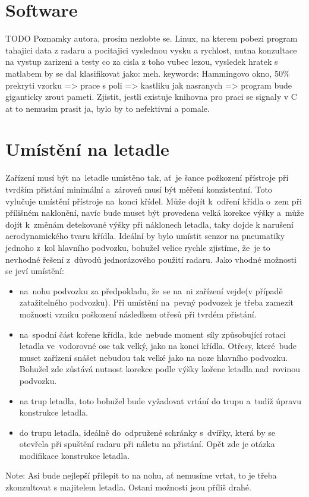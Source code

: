 	\section{Software}\label{navrhReseni::software}
		
		TODO Poznamky autora, prosim nezlobte se. Linux, na kterem pobezi program tahajici data z radaru a pocitajici vyslednou vysku a rychlost, nutna konzultace na vystup zarizeni a testy co za cisla z toho vubec lezou, vysledek hratek s matlabem by se dal klasifikovat jako: meh. keywords: Hammingovo okno, 50\% prekryti vzorku => prace s poli => kastliku jak nasranych => program bude giganticky zrout pameti. Zjistit, jestli existuje knihovna pro praci se signaly v C at to nemusim prasit ja, bylo by to nefektivni a pomale.
	
	\section{Umístění na letadle}\label{navrhReseni::umisteniNaLetadle}
		Zařízení musí být na~letadle umístěno tak, ať~je šance požkození přístroje při tvrdším přistání minimální a~zároveň musí být měření konzistentní. Toto vylučuje umístění přístroje na~konci křídel. Může dojít k~odření křídla o~zem při přílišném naklonění, navíc bude muset být provedena velká korekce výšky a~může dojít k~změnám detekované výšky při náklonech letadla, taky dojde k narušení aerodynamického tvaru křídla. Ideální by bylo umístit senzor na pneumatiky jednoho z~kol hlavního podvozku, bohužel velice rychle zjistíme, že~je to nevhodné řešení z~důvodů jednorázového použití radaru. Jako vhodné možnosti se jeví umístění:
		\begin{itemize}
			\item na~nohu podvozku za předpokladu, že~se na~ni zařízení vejde(v případě zatažitelného podvozku). Při umístění na~pevný podvozek je třeba zamezit možnosti vzniku poškození následkem otřesů při tvrdém přistání. 
			\item na~spodní část kořene křídla, kde~nebude moment síly způsobující rotaci letadla ve~vodorovné ose tak velký, jako na konci křídla. Otřesy, které~bude muset zařízení snášet nebudou tak velké jako na noze hlavního podvozku. Bohužel zde zůstává nutnost korekce podle výšky kořene letadla nad~rovinou podvozku.
			\item na trup letadla, toto bohužel bude vyžadovat vrtání do trupu a~tudíž úpravu konstrukce letadla.
			\item do trupu letadla, ideálně do~odpružené schránky s~dvířky, která by se otevřela při spuštění radaru při náletu na přistání. Opět zde je otázka modifikace konstrukce letadla.
		\end{itemize} 
		Note: Asi bude nejlepší přilepit to na nohu, ať nemusíme vrtat, to je třeba zkonzultovat s majitelem letadla. Ostaní možnosti jsou příliš drahé.


